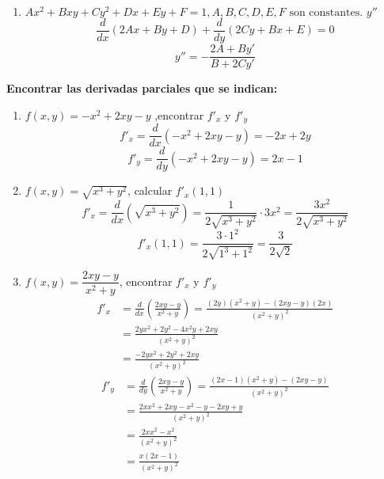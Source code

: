 \documentclass[answers]{exam} %
\begin{document}
\begin{questions}
\begin{enumerate}[label=\alph*.]
        \item $\displaystyle Ax^2+Bxy+Cy^2+Dx+Ey+F=1, A,B,C,D,E,F \text{ son constantes. } y''$
              \[
                  \frac{d}{d x}(2Ax + By + D) + \frac{d}{d y}(2Cy + Bx + E) = 0
              \]
              \[
                  y'' = -\frac{2A + By'}{B + 2C y'}
              \]
    \end{enumerate}


    \vspace{0.5cm}

    \question \large\textbf{Encontrar las derivadas parciales que se indican: }


    \begin{enumerate}[label=\alph*.]
        \item $\displaystyle f(x,y)=-x^2+2xy-y$ ,encontrar $f'_x$ y $f'_y$
              \[
                  f'_x = \frac{d}{d x} (-x^2 + 2xy - y) = -2x + 2y
              \]
              \[
                  f'_y = \frac{d}{d y} (-x^2 + 2xy - y) = 2x - 1
              \]

        \item $\displaystyle f(x,y)=\sqrt{x^3+y^2}$, calcular $f'_x(1,1)$
              \[
                  f'_x = \frac{d}{d x} (\sqrt{x^3 + y^2}) = \frac{1}{2\sqrt{x^3 + y^2}} \cdot 3x^2 = \frac{3x^2}{2\sqrt{x^3 + y^2}}
              \]
              \[
                  f'_x(1,1) = \frac{3 \cdot 1^2}{2 \sqrt{1^3 + 1^2}} = \frac{3}{2\sqrt{2}}
              \]

        \item $\displaystyle f(x,y)=\dfrac{2xy-y}{x^2+y}$, encontrar $f'_x$ y $f'_y$
              \begin{align*}
                  f'_x & = \frac{d}{d x} \left( \frac{2xy - y}{x^2 + y} \right) = \frac{(2y)(x^2 + y) - (2xy - y)(2x)}{(x^2 + y)^2} \\
                       & = \frac{2yx^2 + 2y^2 - 4x^2y + 2xy}{(x^2 + y)^2}                                                           \\
                       & = \frac{-2yx^2 + 2y^2 + 2xy}{(x^2 + y)^2}
              \end{align*}
              \begin{align*}
                  f'_y & = \frac{d}{d y} \left( \frac{2xy - y}{x^2 + y} \right) = \frac{(2x - 1)(x^2 + y) - (2xy - y)}{(x^2 + y)^2} \\
                       & = \frac{2x x^2 + 2xy - x^2 - y - 2xy + y}{(x^2 + y)^2}                                                     \\
                       & = \frac{2xx^2 - x^2}{(x^2 + y)^2}                                                                          \\
                       & = \frac{x(2x - 1)}{(x^2 + y)^2}
              \end{align*}
    \end{enumerate}


\end{questions}
\end{document}
